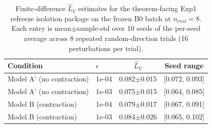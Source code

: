 \begin{table}[t]
\centering
\caption{Finite-difference $\hat L_V$ estimates for the theorem-facing Exp1 refreeze isolation package on the frozen B0 batch at $n_{\mathrm{eval}}{=}8$. Each entry is mean$\pm$sample-std over 10 seeds of the per-seed average across 8 repeated random-direction trials (16 perturbations per trial).}
\label{tab:exp1_value_head_lipschitz}
\begin{tabular}{llcc}
\toprule
Condition & $\epsilon$ & $\hat L_V$ & Seed range \\
\midrule
  Model A' (no contraction) & 1e-04 & 0.082$\pm$0.015 & [0.072, 0.093] \\
  Model A' (no contraction) & 1e-03 & 0.075$\pm$0.015 & [0.064, 0.085] \\
  Model B (contraction) & 1e-04 & 0.079$\pm$0.017 & [0.067, 0.091] \\
  Model B (contraction) & 1e-03 & 0.084$\pm$0.026 & [0.065, 0.102] \\
\bottomrule
\end{tabular}
\end{table}